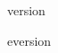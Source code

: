\documentclass{ltxdoc}
\begin{document}
\maketitle

\setcounter{int}{1}

\edef\tempa{\csname 
    version\alphalph{\theint}\endcsname}
\edef\tempb{\csname 
    eversion\alphalph{\theint}\endcsname}

\tempa

\tempb

\installation
\release
\end{document}
